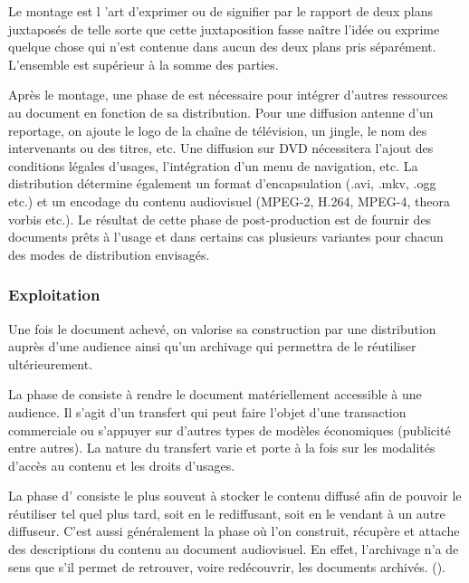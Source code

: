 \begin{cico}
Le montage est l 'art d'exprimer ou de signifier par le rapport de deux plans juxtaposés de telle sorte que cette juxtaposition fasse naître l'idée ou exprime quelque chose qui n'est contenue dans aucun des deux plans pris séparément. L'ensemble est supérieur à la somme des parties.
\end{cico}

Après le montage, une phase de  est nécessaire pour intégrer d'autres ressources au document en fonction de sa distribution. 
Pour une diffusion antenne d'un reportage, on ajoute le logo de la chaîne de télévision, un jingle, le nom des intervenants ou des titres, etc. 
Une diffusion sur DVD nécessitera l'ajout des conditions
légales d'usages, l'intégration d'un menu de navigation, etc. 
La distribution détermine également un format d'encapsulation (.avi, .mkv, .ogg etc.) et un encodage du contenu audiovisuel (MPEG-2, H.264, MPEG-4, theora vorbis etc.). 
Le résultat de cette phase de post-production est de fournir des documents prêts à l'usage et dans certains cas plusieurs variantes pour chacun des modes de distribution envisagés.


\subsubsection*{Exploitation}
Une fois le document achevé, on valorise sa construction par une distribution auprès d'une audience ainsi qu'un archivage qui permettra de le réutiliser ultérieurement.

La phase de  consiste à rendre le document matériellement accessible à une audience. 
Il s'agit d'un transfert qui peut faire l'objet d'une transaction commerciale ou s'appuyer sur d'autres types de modèles économiques (publicité entre autres). 
La nature du transfert varie et porte à la fois sur les modalités d'accès au contenu et les droits d'usages.

La phase d' consiste le plus souvent à stocker le contenu diffusé afin de pouvoir le réutiliser tel quel plus tard, soit en le rediffusant, soit en le vendant à un autre diffuseur. 
C'est aussi généralement la phase où l'on construit, récupère et attache des descriptions du contenu au document audiovisuel. 
En effet, l'archivage n'a de sens que s'il permet de retrouver, voire redécouvrir, les documents archivés.
 (\cite{Blanc2006}).%




